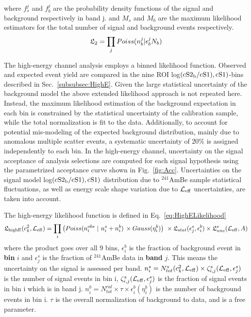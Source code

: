 where $f^j_s$ and $f^j_b$ are the probability density functions of the signal and background respectively in band j. and $M_s$ and $M_b$ are the maximum likelihood estimators for the total number of signal and background events respectively.
\begin{equation}
\mathfrak{L}_2 = \prod_j Poiss(n^j_b | \epsilon_b^jN_b)
\end{equation} 

The high-energy channel analysis employs a binned likelihood function. Observed and expected event yield are compared in the nine ROI log$(\mathrm{cS2}_\mathrm{b}/\mathrm{cS1}),\mathrm{cS1}{})$-bins described in Sec.~\ref{subsubsec:HighE}. 
Given the large statistical uncertainty of the background model the above extended likelihood approach is not repeated here.
Instead, the maximum likelihood estimation of the background expectation in each bin is constrained by the statistical uncertainty of the calibration sample, while the total 
normalization is fit to the data. Additionally, to account for potential mis-modeling of the expected background distribution, mainly due to anomalous multiple scatter events,
a systematic uncertainty of 20\% is assigned independently to each bin. In the high-energy channel, uncertainty on the signal acceptance of analysis selections are computed for each signal hypothesis using the parametrized acceptance curve shown in Fig.~\ref{fig:Acc}.
Uncertainties on the signal model log$(\mathrm{cS2}_\mathrm{b}/\mathrm{cS1}),\mathrm{cS1}{})$ distribution due to $^{241}$AmBe sample statistical fluctuations, as well as energy scale shape variation due to $\mathcal{L}_{\mathrm{eff}}$ uncertainties, are taken into account.


The high-energy likelihood function is defined in Eq.~\ref{eq:HighELikelihood}
\begin{equation}
\label{eq:HighELikelihood}
\mathfrak{L}_{\mathrm{highE}}(c_k^2,\mathcal{L}_{\mathrm{eff}}) = \prod_{i} \big( Poiss(n^{obs}_{i}~|~n^{s}_{i} + n^{b}_{i}) \, \times Gauss(\eta^{b}_{i}) \big) ~ \times \mathfrak{L}_{stat}(\epsilon^{s}_{j},\epsilon^{b}_{i}) \times \mathfrak{L}^s_{unc}(\mathcal{L}_{\mathrm{eff}}, A)
\end{equation}
where the product goes over all 9 bins, $\epsilon^{b}_{i}$ is the fraction of background event in \textbf{bin} $i$ and  $\epsilon^{s}_{j}$ is the fraction of $^{241}$AmBe data in \textbf{band} $j$. This means the uncertainty on the signal is assessed per band. $n_i^s = N_{tot}^s(c_k^2,\mathcal{L}_{\mathrm{eff}}) \times \zeta_{i,j}^s(\mathcal{L}_{\mathrm{eff}} ,\epsilon^{s}_{j})$ is the number of signal events in bin i, $\zeta_{i,j}^s(\mathcal{L}_{\mathrm{eff}}, \epsilon^{s}_{j})$ is the fraction of signal events in bin i which is in band j. $n_i^b = N_{tot}^{cal} \times \tau \times \epsilon^{b}_{i}(\eta^{b}_{i})$ is the number of background events in bin i. $\tau$ is the overall normalization of background to data, and is a free parameter.  

